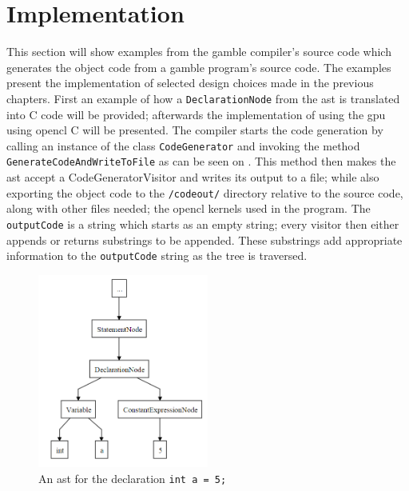 \section{Implementation}
This section will show examples from the \gls{gamble} compiler's source code which generates the object code from a \gls{gamble} program's source code.
The examples present the implementation of selected design choices made in the previous chapters.
First an example of how a \texttt{DeclarationNode} from the \acrshort{ast} is translated into C code will be provided; afterwards the implementation of using the \acrshort{gpu} using \gls{opencl} C will be presented.
The compiler starts the code generation by calling an instance of the class \texttt{CodeGenerator} and invoking the method \texttt{GenerateCodeAndWriteToFile} as can be seen on .
This method then makes the \acrshort{ast} accept a CodeGeneratorVisitor and writes its output to a file; while also exporting the object code to the \texttt{/codeout/} directory relative to the source code, along with other files needed; the \gls{opencl} kernels used in the program.
The \texttt{outputCode} is a string which starts as an empty string; every visitor then either appends or returns substrings to be appended.
These substrings add appropriate information to the \texttt{outputCode} string as the tree is traversed.

\begin{figure}
\centering
\includegraphics[width=0.5\textwidth]{figures/Trees/ASTAlone.PNG}
\caption{An \acrshort{ast} for the declaration \texttt{int a = 5;}}\label{fig:ASTAlone}
\end{figure}

